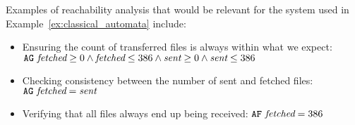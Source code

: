 \fi

\begin{example}
Examples of reachability analysis that would be relevant for the system used in
Example~\ref{ex:classical_automata} include:
\begin{itemize}
\item
   Ensuring the count of transferred files is always within what we expect:
$\agop{}~\textit{fetched}  \land \textit{fetched}  \land
   \textit{sent}  \land \textit{sent} $
\item
   Checking consistency between the number of sent and fetched files:
   $\text{\texttt{AG}}{}{}~\textit{fetched} = \textit{sent}$
\item
   Verifying that all files always end up being received:
   $\text{\texttt{AF}}{}{}~\textit{fetched} = 386$
\end{itemize}
\end{example}
